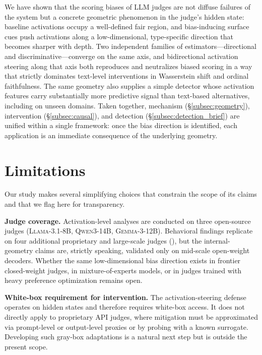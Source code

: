 \documentclass[11pt]{article}
\let\Cref\crtCref
\begin{document}
We have shown that the scoring biases of LLM judges are not diffuse failures of the system but a concrete geometric phenomenon in the judge's hidden state: baseline activations occupy a well-defined fair region, and bias-inducing surface cues push activations along a low-dimensional, type-specific direction that becomes sharper with depth. Two independent families of estimators---directional and discriminative---converge on the same axis, and bidirectional activation steering along that axis both reproduces and neutralizes biased scoring in a way that strictly dominates text-level interventions in Wasserstein shift and ordinal faithfulness. The same geometry also supplies a simple detector whose activation features carry substantially more predictive signal than text-based alternatives, including on unseen domains. Taken together, mechanism (§\ref{subsec:geometry}), intervention (§\ref{subsec:causal}), and detection (§\ref{subsec:detection_brief}) are unified within a single framework: once the bias direction is identified, each application is an immediate consequence of the underlying geometry.


\section*{Limitations}
\label{sec:limitations}

Our study makes several simplifying choices that constrain the scope of its claims and that we flag here for transparency.

\textbf{Judge coverage.} Activation-level analyses are conducted on three open-source judges (\textsc{Llama-3.1-8B}, \textsc{Qwen3-14B}, \textsc{Gemma-3-12B}). Behavioral findings replicate on four additional proprietary and large-scale judges (\Cref{app:model_replication}), but the internal-geometry claims are, strictly speaking, validated only on mid-scale open-weight decoders. Whether the same low-dimensional bias direction exists in frontier closed-weight judges, in mixture-of-experts models, or in judges trained with heavy preference optimization remains open.

\textbf{White-box requirement for intervention.} The activation-steering defense operates on hidden states and therefore requires white-box access. It does not directly apply to proprietary API judges, where mitigation must be approximated via prompt-level or output-level proxies or by probing with a known surrogate. Developing such gray-box adaptations is a natural next step but is outside the present scope.
\end{document}
